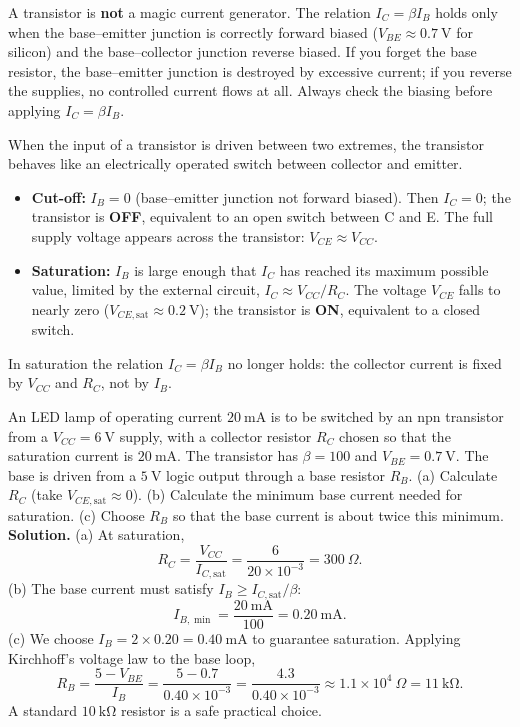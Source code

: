 \documentclass[11pt]{article}
\newcounter{popsec}
\newcounter{popsub}
\newcommand{\courssub}[1]{%
  \stepcounter{popsub}%
  \par\vspace{9pt}\noindent{\popxbold\fontsize{11.5}{13}\selectfont\color{popink}{\color{poporange}\thepopsec.\thepopsub}\hspace{6pt}#1}\par\nopagebreak\vspace{4pt}
}
\begin{document}
\begin{attention}
A transistor is \textbf{not} a magic current generator. The relation $I_C = \beta I_B$ holds only when the base--emitter junction is correctly forward biased ($V_{BE} \approx 0.7\ \mathrm{V}$ for silicon) and the base--collector junction reverse biased. If you forget the base resistor, the base--emitter junction is destroyed by excessive current; if you reverse the supplies, no controlled current flows at all. Always check the biasing before applying $I_C = \beta I_B$.
\end{attention}

\courssub{The Transistor as a Switch}

When the input of a transistor is driven between two extremes, the transistor behaves like an electrically operated switch between collector and emitter.

\begin{definition}
\begin{itemize}
\item \textbf{Cut-off:} $I_B = 0$ (base--emitter junction not forward biased). Then $I_C = 0$; the transistor is \textbf{OFF}, equivalent to an open switch between C and E. The full supply voltage appears across the transistor: $V_{CE} \approx V_{CC}$.
\item \textbf{Saturation:} $I_B$ is large enough that $I_C$ has reached its maximum possible value, limited by the external circuit, $I_C \approx V_{CC}/R_C$. The voltage $V_{CE}$ falls to nearly zero ($V_{CE,\mathrm{sat}} \approx 0.2\ \mathrm{V}$); the transistor is \textbf{ON}, equivalent to a closed switch.
\end{itemize}
In saturation the relation $I_C = \beta I_B$ no longer holds: the collector current is fixed by $V_{CC}$ and $R_C$, not by $I_B$.
\end{definition}

\begin{exoresolu}
An LED lamp of operating current $20\ \mathrm{mA}$ is to be switched by an npn transistor from a $V_{CC} = 6\ \mathrm{V}$ supply, with a collector resistor $R_C$ chosen so that the saturation current is $20\ \mathrm{mA}$. The transistor has $\beta = 100$ and $V_{BE} = 0.7\ \mathrm{V}$. The base is driven from a $5\ \mathrm{V}$ logic output through a base resistor $R_B$. (a) Calculate $R_C$ (take $V_{CE,\mathrm{sat}} \approx 0$). (b) Calculate the minimum base current needed for saturation. (c) Choose $R_B$ so that the base current is about twice this minimum.
\tcblower
\textbf{Solution.} (a) At saturation,
\[ R_C = \frac{V_{CC}}{I_{C,\mathrm{sat}}} = \frac{6}{20\times 10^{-3}} = 300\ \Omega. \]
(b) The base current must satisfy $I_B \geq I_{C,\mathrm{sat}}/\beta$:
\[ I_{B,\min} = \frac{20\ \mathrm{mA}}{100} = 0.20\ \mathrm{mA}. \]
(c) We choose $I_B = 2 \times 0.20 = 0.40\ \mathrm{mA}$ to guarantee saturation. Applying Kirchhoff's voltage law to the base loop,
\[ R_B = \frac{5 - V_{BE}}{I_B} = \frac{5 - 0.7}{0.40\times 10^{-3}} = \frac{4.3}{0.40\times 10^{-3}} \approx 1.1\times 10^{4}\ \Omega = 11\ \mathrm{k\Omega}. \]
A standard $10\ \mathrm{k\Omega}$ resistor is a safe practical choice.
\end{exoresolu}
\end{document}

